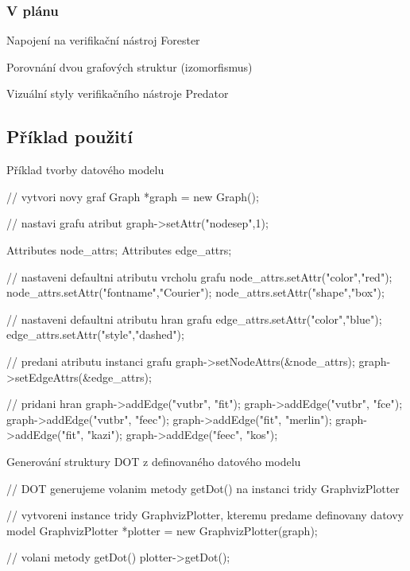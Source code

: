 \subsubsection*{V plánu}


\begin{DoxyItemize}
\item Napojení na verifikační nástroj Forester
\item Porovnání dvou grafových struktur (izomorfismus)
\item Vizuální styly verifikačního nástroje Predator
\end{DoxyItemize}

\subsection*{Příklad použití}

Příklad tvorby datového modelu \begin{DoxyVerb}// vytvori novy graf
Graph *graph = new Graph();

// nastavi grafu atribut
graph->setAttr("nodesep",1);

Attributes node_attrs;
Attributes edge_attrs;

// nastaveni defaultni atributu vrcholu grafu
node_attrs.setAttr("color","red");
node_attrs.setAttr("fontname","Courier");
node_attrs.setAttr("shape","box");

// nastaveni defaultni atributu hran grafu
edge_attrs.setAttr("color","blue");
edge_attrs.setAttr("style","dashed");

// predani atributu instanci grafu
graph->setNodeAttrs(&node_attrs);
graph->setEdgeAttrs(&edge_attrs);

// pridani hran
graph->addEdge("vutbr", "fit");
graph->addEdge("vutbr", "fce");
graph->addEdge("vutbr", "feec");
graph->addEdge("fit", "merlin");
graph->addEdge("fit", "kazi");
graph->addEdge("feec", "kos");
\end{DoxyVerb}


Generování struktury D\+OT z definovaného datového modelu \begin{DoxyVerb}// DOT generujeme volanim metody getDot() na instanci tridy GraphvizPlotter

// vytvoreni instance tridy GraphvizPlotter, kteremu predame definovany datovy model    
GraphvizPlotter *plotter = new GraphvizPlotter(graph);

// volani metody getDot()
plotter->getDot();
\end{DoxyVerb}


